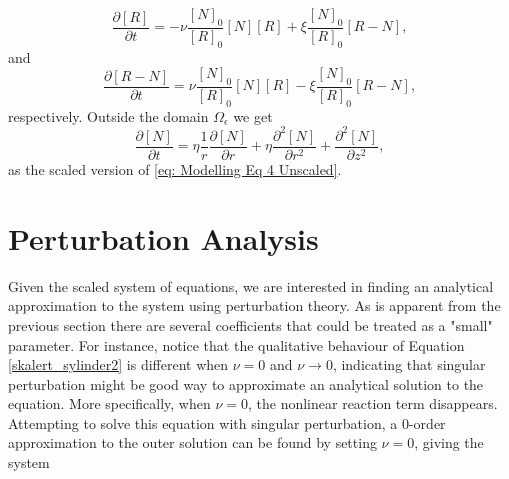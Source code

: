 \documentclass{article}
\begin{document}
\begin{equation}
    \frac{\partial [R]}{\partial t} = - \nu \frac{[N]_0}{[R]_0} [N][R] + \xi \frac{[N]_0}{[R]_0} [R-N],
    \label{skalert_sylinder3}
\end{equation}
and 
\begin{equation}
    \frac{\partial [R-N]}{\partial t} = \nu \frac{[N]_0}{[R]_0} [N][R] - \xi \frac{[N]_0}{[R]_0} [R-N],
    \label{skalert_sylinder4}
\end{equation}
respectively. Outside the domain $\Omega_\epsilon$ we get
\begin{equation}
    \frac{\partial [N]}{\partial t} = 
    \eta \frac{1}{r} \frac{\partial [N]}{\partial r} +\eta  \frac{\partial^2 [N]}{\partial r^2}  +  \frac{\partial^2 [N]}{\partial z^2},
    \label{skalert_sylinder5}
\end{equation}
as the scaled version of \eqref{eq: Modelling Eq 4 Unscaled}.

\section{Perturbation Analysis}
Given the scaled system of equations, we are interested in finding an analytical approximation to the system using perturbation theory. As is apparent from the previous section there are several coefficients that could be treated as a "small" parameter. For instance, notice that the qualitative behaviour of Equation \eqref{skalert_sylinder2} is different when $\nu = 0$ and $\nu \rightarrow 0$, indicating that singular perturbation might be good way to approximate an analytical solution to the equation. More specifically, when $\nu = 0$, the nonlinear reaction term disappears. Attempting to solve this equation with singular perturbation, a 0-order approximation to the outer solution can be found by setting $\nu = 0$, giving the system 
\end{document}
